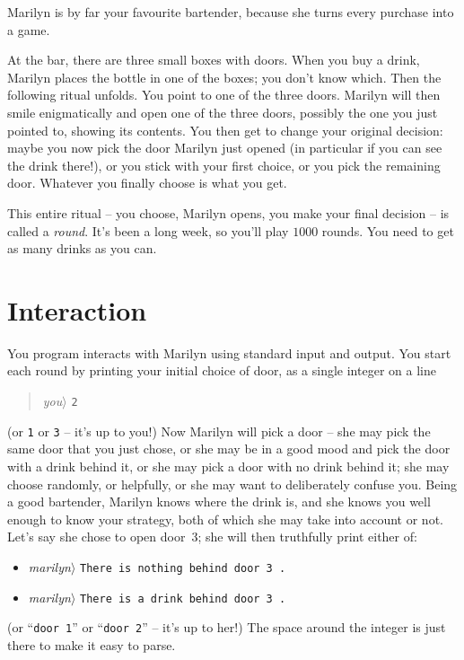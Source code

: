 


Marilyn is by far your favourite bartender, because she turns every purchase into a game.

At the bar, there are three small boxes with doors.
When you buy a drink, Marilyn places the bottle in one of the boxes; you don't know which.
Then the following ritual unfolds.
You point to one of the three doors.
Marilyn will then smile enigmatically and open one of the three doors, possibly the one you just pointed to, showing its contents.
You then get to change your original decision: maybe you now pick the door Marilyn just opened (in particular if you can see the drink there!), or you stick with your first choice, or you pick the remaining door.
Whatever you finally choose is what you get.

This entire ritual – you choose, Marilyn opens, you make your final decision -- is called a \emph{round}.
It’s been a long week, so you’ll play $1000$ rounds.
You need to get as many drinks as you can.

\section*{Interaction}

You program interacts with Marilyn using standard input and output.
You start each round by printing your initial choice of door, as a single integer on a line
\begin{quote}\emph{you}$\rangle$ \verb|2|\end{quote}
(or \verb|1| or \verb|3| -- it's up to you!)
Now Marilyn will pick a door -- she may pick the same door that you just chose, or she may be in a good mood and pick the door with a drink behind it, or she may pick a door with no drink behind it; she may choose randomly, or helpfully, or she may want to deliberately confuse you.
Being a good bartender, Marilyn knows where the drink is, and she knows you well enough to know your strategy, both of which she may take into account or not.
Let's say she chose to open door~3; she will then truthfully print either of:
\begin{itemize}
  \item
\emph{marilyn}$\rangle$ \verb|There is nothing behind door 3 .|
\item
  \emph{marilyn}$\rangle$ \verb|There is a drink behind door 3 .|
\end{itemize}
(or “\verb|door 1|” or “\verb|door 2|” -- it's up to her!) 
The space around the integer is just there to make it easy to parse.

